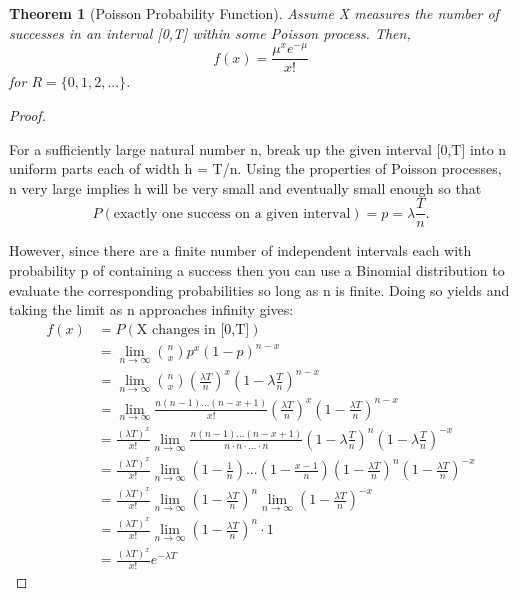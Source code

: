 \documentclass[10pt,]{book}
\theoremstyle{plain}
\newtheorem{theorem}{Theorem}[section]
\theoremstyle{definition}
\theoremstyle{definition}
\theoremstyle{definition}
\numberwithin{equation}{section}
\begin{document}
\begin{theorem}[{Poisson Probability Function}]\label{theorem-45}
Assume X measures the number of successes in an interval [0,T] within some Poisson process. Then, 
\begin{equation*}f(x) = \frac{\mu^x e^{-\mu}}{x!}\end{equation*}
for \(R = \{ 0, 1, 2, ... \}\).
%
\end{theorem}
\begin{proof}\hypertarget{proof-44}{}

For a sufficiently large natural number n, break up the given interval [0,T] into n uniform parts each of width h = T/n.  Using the properties of Poisson processes, n very large implies h will be very small and eventually small enough so that 
\begin{equation*}P(\text{exactly one success on a given interval}) = p = \lambda \frac{T}{n}.\end{equation*} 

However, since there are a finite number of independent intervals each with probability p of containing a success then you can use a Binomial distribution to evaluate the corresponding probabilities so long as n is finite. Doing so yields and taking the limit as n approaches infinity gives:
\begin{align*}
f(x) & = P(\text{X changes in [0,T]}) \\
 & = \lim_{n \rightarrow \infty} \binom{n}{x} p^x (1-p)^{n-x}\\
 & = \lim_{n \rightarrow \infty} \binom{n}{x} (\frac{\lambda T}{n})^x (1-\lambda \frac{T}{n})^{n-x}\\
 & = \lim_{n \rightarrow \infty} \frac{n(n-1)...(n-x+1)}{x!} ( \frac{\lambda T}{n})^x (1- \frac{\lambda T}{n})^{n-x}\\
 & = \frac{(\lambda T)^x}{x!} \lim_{n \rightarrow \infty} \frac{n(n-1)...(n-x+1)}{n \cdot n \cdot ... \cdot n} (1-\lambda \frac{T}{n})^{n}(1-\lambda \frac{T}{n})^{-x}\\
 & = \frac{(\lambda T)^x}{x!} \lim_{n \rightarrow \infty} (1-\frac{1}{n})...(1-\frac{x-1}{n})  (1- \frac{\lambda T}{n})^{n}(1- \frac{\lambda T}{n})^{-x}\\
 & = \frac{(\lambda T)^x}{x!} 
	\lim_{n \rightarrow \infty} (1- \frac{\lambda T}{n})^{n}
	\lim_{n \rightarrow \infty} (1- \frac{\lambda T}{n})^{-x}\\
 & = \frac{(\lambda T)^x}{x!} 
	\lim_{n \rightarrow \infty} (1- \frac{\lambda T}{n})^{n} \cdot 1\\
 & = \frac{(\lambda T)^x}{x!} 
	e^{-\lambda T}
\end{align*}
%
\end{proof}
\end{document}
